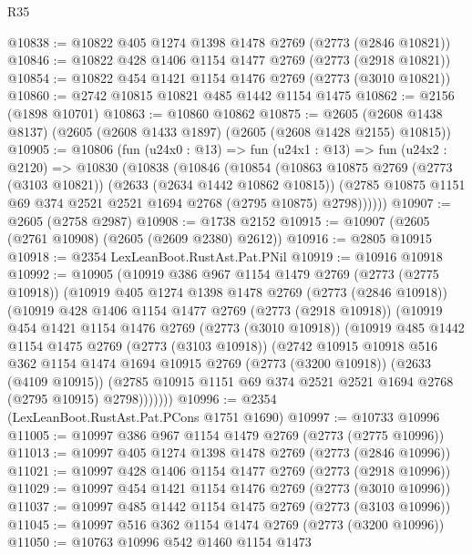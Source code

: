\begin{lexlean}{R35}
\begin{coremodule}
@10838 := @10822 @405 @1274 @1398 @1478 @2769 (@2773 (@2846 @10821))
@10846 := @10822 @428 @1406 @1154 @1477 @2769 (@2773 (@2918 @10821))
@10854 := @10822 @454 @1421 @1154 @1476 @2769 (@2773 (@3010 @10821))
@10860 := @2742 @10815 @10821 @485 @1442 @1154 @1475
@10862 := @2156 (@1898 @10701)
@10863 := @10860 @10862
@10875 := @2605 (@2608 @1438 @8137) (@2605 (@2608 @1433 @1897) (@2605 (@2608 @1428 @2155) @10815))
@10905 := @10806
    (fun (u24x0 : @13) =>
    fun (u24x1 : @13) =>
    fun (u24x2 : @2120) =>
    @10830
      (@10838
        (@10846
          (@10854
            (@10863
              @10875
              @2769
              (@2773 (@3103 @10821))
              (@2633 (@2634 @1442 @10862 @10815))
              (@2785 @10875 @1151 @69 @374 @2521 @2521 @1694 @2768 (@2795 @10875) @2798))))))
@10907 := @2605 (@2758 @2987)
@10908 := @1738 @2152
@10915 := @10907 (@2605 (@2761 @10908) (@2605 (@2609 @2380) @2612))
@10916 := @2805 @10915
@10918 := @2354 LexLeanBoot.RustAst.Pat.PNil
@10919 := @10916 @10918
@10992 := @10905
    (@10919
      @386
      @967
      @1154
      @1479
      @2769
      (@2773 (@2775 @10918))
      (@10919
        @405
        @1274
        @1398
        @1478
        @2769
        (@2773 (@2846 @10918))
        (@10919
          @428
          @1406
          @1154
          @1477
          @2769
          (@2773 (@2918 @10918))
          (@10919
            @454
            @1421
            @1154
            @1476
            @2769
            (@2773 (@3010 @10918))
            (@10919
              @485
              @1442
              @1154
              @1475
              @2769
              (@2773 (@3103 @10918))
              (@2742
                @10915
                @10918
                @516
                @362
                @1154
                @1474
                @1694
                @10915
                @2769
                (@2773 (@3200 @10918))
                (@2633 (@4109 @10915))
                (@2785 @10915 @1151 @69 @374 @2521 @2521 @1694 @2768 (@2795 @10915) @2798)))))))
@10996 := @2354 (LexLeanBoot.RustAst.Pat.PCons @1751 @1690)
@10997 := @10733 @10996
@11005 := @10997 @386 @967 @1154 @1479 @2769 (@2773 (@2775 @10996))
@11013 := @10997 @405 @1274 @1398 @1478 @2769 (@2773 (@2846 @10996))
@11021 := @10997 @428 @1406 @1154 @1477 @2769 (@2773 (@2918 @10996))
@11029 := @10997 @454 @1421 @1154 @1476 @2769 (@2773 (@3010 @10996))
@11037 := @10997 @485 @1442 @1154 @1475 @2769 (@2773 (@3103 @10996))
@11045 := @10997 @516 @362 @1154 @1474 @2769 (@2773 (@3200 @10996))
@11050 := @10763 @10996 @542 @1460 @1154 @1473

\end{coremodule}
\end{lexlean}
